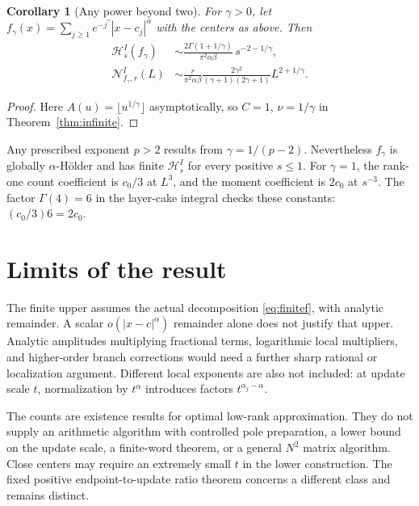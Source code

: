 \documentclass[11pt]{article}
\newtheorem{corollary}[theorem]{Corollary}
\numberwithin{equation}{section}
\newcommand{\cH}{\mathcal H}
\newcommand{\cN}{\mathcal N}
\begin{document}
\begin{corollary}[Any power beyond two]\label{cor:gamma}
For $\gamma>0$, let
$f_\gamma(x)=\sum_{j\ge1}e^{-j^\gamma}|x-c_j|^\alpha$ with the centers
as above. Then
\begin{align}
 \cH_s^I(f_\gamma)&\sim
 \frac{2\Gamma(1+1/\gamma)}{\pi^2\alpha\beta}\,
                         s^{-2-1/\gamma},\label{eq:gammaH}\\
 \cN_{f_\gamma,r}^I(L)&\sim
 \frac{r}{\pi^2\alpha\beta}
 \frac{2\gamma^2}{(\gamma+1)(2\gamma+1)}L^{2+1/\gamma}.
 \label{eq:gammaN}
\end{align}
\end{corollary}
\begin{proof}
Here $A(u)=\lfloor u^{1/\gamma}\rfloor$ asymptotically, so
$C=1$, $\nu=1/\gamma$ in Theorem~\ref{thm:infinite}.
\end{proof}

Any prescribed exponent $p>2$ results from $\gamma=1/(p-2)$.
Nevertheless $f_\gamma$ is globally $\alpha$-H\"older and has finite
$\cH_s^I$ for every positive $s\le1$.
For $\gamma=1$, the rank-one count coefficient is $c_0/3$ at $L^3$,
and the moment coefficient is $2c_0$ at $s^{-3}$.
The factor $\Gamma(4)=6$ in the layer-cake integral checks these
constants: $(c_0/3)6=2c_0$.

\section{Limits of the result}

The finite upper assumes the actual decomposition
\eqref{eq:finitef}, with analytic remainder.
A scalar $o(|x-c|^\alpha)$ remainder alone does not justify that upper.
Analytic amplitudes multiplying fractional terms, logarithmic local
multipliers, and higher-order branch corrections would need a further
sharp rational or localization argument.
Different local exponents are also not included: at update scale $t$,
normalization by $t^\alpha$ introduces factors $t^{\alpha_j-\alpha}$.

The counts are existence results for optimal low-rank approximation.
They do not supply an arithmetic algorithm with controlled pole
preparation, a lower bound on the update scale, a finite-word theorem,
or a general $N^2$ matrix algorithm. Close centers may require an
extremely small $t$ in the lower construction. The fixed positive
endpoint-to-update ratio theorem \cite{Bounded} concerns a different
class and remains distinct.
\end{document}
